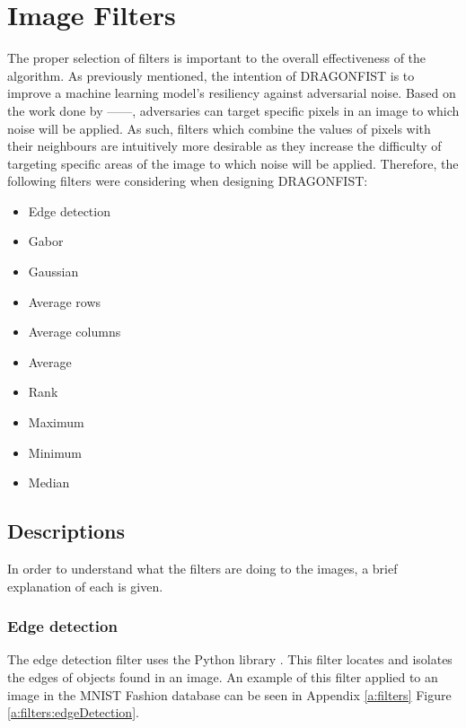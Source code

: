 \section{Image Filters} \label{s:filters}
	The proper selection of filters is important to the overall effectiveness of the algorithm. As previously mentioned, the intention of DRAGONFIST is to improve a machine learning model's resiliency against adversarial noise. Based on the work done by ------, adversaries can target specific pixels in an image to which noise will be applied. As such, filters which combine the values of pixels with their neighbours are intuitively more desirable as they increase the difficulty of targeting specific areas of the image to which noise will be applied. Therefore, the following filters were considering when designing DRAGONFIST:
	\begin{multicols}{2}
		\begin{itemize}
			\item Edge detection
			\item Gabor
			\item Gaussian
			\item Average rows
			\item Average columns
			\item Average
			\item Rank
			\item Maximum
			\item Minimum
			\item Median
		\end{itemize}
	\end{multicols}

	\subsection{Descriptions} \label{s:filters:descriptions}
		In order to understand what the filters are doing to the images, a brief explanation of each is given.

		\subsubsection{Edge detection} \label{s:filters:descriptions:edgeDetection}
			The edge detection filter uses the Python library  \cite{skikitImage}. This filter locates and isolates the edges of objects found in an image. An example of this filter applied to an image in the MNIST Fashion database \cite{zalandoresearchFashionMNIST} can be seen in Appendix \ref{a:filters} Figure \ref{a:filters:edgeDetection}.

